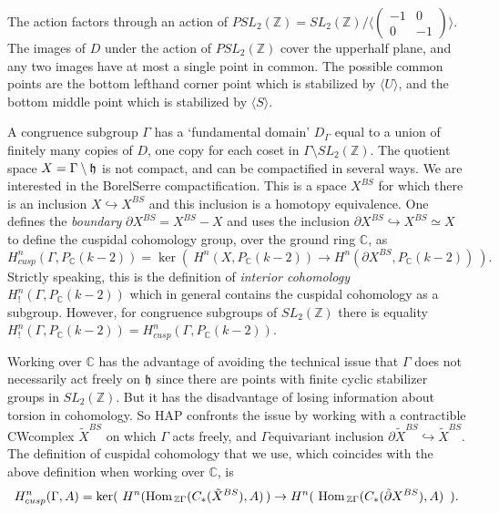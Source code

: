 \documentclass[a4paper,11pt]{report}
\begin{document}
{{ 

 The action factors through an action of $PSL_2(\mathbb Z) =SL_2(\mathbb Z)/\langle \left(\begin{array}{rr}-1&0\\ 0 &-1
\end{array}\right)\rangle$. The images of $D$ under the action of $PSL_2(\mathbb Z)$ cover the upper\texttt{}half plane, and any two images have at most
a single point in common. The possible common points are the bottom
left\texttt{}hand corner point which is stabilized by $\langle U\rangle$, and the bottom middle point which is stabilized by $\langle S\rangle$. 

 A congruence subgroup $\Gamma$ has a `fundamental domain' $D_\Gamma$ equal to a union of finitely many copies of $D$, one copy for each coset in $\Gamma\setminus SL_2(\mathbb Z)$. The quotient space $X=\Gamma\setminus {\frak h}$ is not compact, and can be compactified in several ways. We are interested in
the Borel\texttt{}Serre compactification. This is a space $X^{BS}$ for which there is an inclusion $X\hookrightarrow X^{BS}$ and this inclusion is a homotopy equivalence. One defines the \emph{boundary} $\partial X^{BS} = X^{BS} - X$ and uses the inclusion $\partial X^{BS} \hookrightarrow X^{BS} \simeq X$ to define the cuspidal cohomology group, over the ground ring $\mathbb C$, as 
\[ H_{cusp}^n(\Gamma,P_{\mathbb C}(k-2)) = \ker (\ H^n(X,P_{\mathbb C}(k-2))
\rightarrow H^n(\partial X^{BS},P_{\mathbb C}(k-2)) \ ).\]
 Strictly speaking, this is the definition of \emph{interior cohomology} $H_!^n(\Gamma,P_{\mathbb C}(k-2))$ which in general contains the cuspidal cohomology as a subgroup. However, for
congruence subgroups of $SL_2(\mathbb Z)$ there is equality $H_!^n(\Gamma,P_{\mathbb C}(k-2)) = H_{cusp}^n(\Gamma,P_{\mathbb C}(k-2))$. 

 Working over $\mathbb C$ has the advantage of avoiding the technical issue that $\Gamma $ does not necessarily act freely on ${\frak h}$ since there are points with finite cyclic stabilizer groups in $SL_2(\mathbb Z)$. But it has the disadvantage of losing information about torsion in
cohomology. So HAP confronts the issue by working with a contractible
CW\texttt{}complex $\tilde X^{BS}$ on which $\Gamma$ acts freely, and $\Gamma$\texttt{}equivariant inclusion $\partial \tilde X^{BS} \hookrightarrow \tilde X^{BS}$. The definition of cuspidal cohomology that we use, which coincides with the
above definition when working over $\mathbb C$, is 
\[ H_{cusp}^n(\Gamma,A) = \ker (\ H^n({\rm Hom}_{\, \mathbb
Z\Gamma}(C_\ast(\tilde X^{BS}), A)\, ) \rightarrow H^n(\ {\rm Hom}_{\, \mathbb
Z\Gamma}(C_\ast(\tilde \partial X^{BS}), A)\, \ ).\]
 

}}
\end{document}
